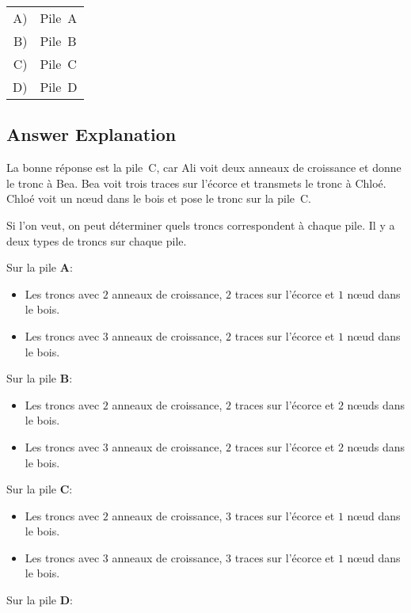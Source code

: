 \documentclass[a4paper,11pt]{report}
\begin{document}
\begin{tabular}{ @{} r l @{} }
  A) & Pile~A \\ 
  B) & Pile~B \\ 
  C) & Pile~C \\ 
  D) & Pile~D
\end{tabular}

\endgroup

\subsection*{Answer Explanation}

La bonne réponse est la pile~C, car Ali voit deux anneaux de croissance et donne le tronc à Bea. Bea voit trois traces sur l’écorce et transmets le tronc à Chloé. Chloé voit un nœud dans le bois et pose le tronc sur la pile~C.

Si l’on veut, on peut déterminer quels troncs correspondent à chaque pile. Il y a deux types de troncs sur chaque pile.

Sur la pile \textbf{A}:

\begin{itemize}
  \item Les troncs avec $2$ anneaux de croissance, $2$ traces sur l’écorce et $1$ nœud dans le bois.
  \item Les troncs avec $3$ anneaux de croissance, $2$ traces sur l’écorce et $1$ nœud dans le bois.
\end{itemize}

Sur la pile \textbf{B}:

\begin{itemize}
  \item Les troncs avec $2$ anneaux de croissance, $2$ traces sur l’écorce et $2$ nœuds dans le bois.
  \item Les troncs avec $3$ anneaux de croissance, $2$ traces sur l’écorce et $2$ nœuds dans le bois.
\end{itemize}

Sur la pile \textbf{C}:

\begin{itemize}
  \item Les troncs avec $2$ anneaux de croissance, $3$ traces sur l’écorce et $1$ nœud dans le bois.
  \item Les troncs avec $3$ anneaux de croissance, $3$ traces sur l’écorce et $1$ nœud dans le bois.
\end{itemize}

Sur la pile \textbf{D}:
\end{document}
